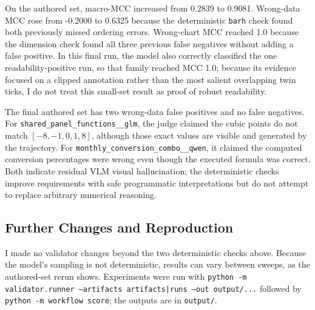 \documentclass[11pt]{article}
\begin{document}
On the authored set, macro-MCC increased from 0.2839 to 0.9081. Wrong-data MCC
rose from -0.2000 to 0.6325 because the deterministic \texttt{barh} check found
both previously missed ordering errors. Wrong-chart MCC reached 1.0 because the
dimension check found all three previous false negatives without adding a false
positive. In this final run, the model also correctly classified the one
readability-positive run, so that family reached MCC 1.0; because its evidence
focused on a clipped annotation rather than the most salient overlapping twin
ticks, I do not treat this small-set result as proof of robust readability.

The final authored set has two wrong-data false positives and no false
negatives. For \texttt{shared\_panel\_functions\_\_glm}, the judge claimed the
cubic points do not match $[-8,-1,0,1,8]$, although those exact values are
visible and generated by the trajectory. For
\texttt{monthly\_conversion\_combo\_\_qwen}, it claimed the computed
conversion percentages were wrong even though the executed formula was
correct. Both indicate residual VLM visual hallucination; the deterministic
checks improve requirements with safe programmatic interpretations but do not
attempt to replace arbitrary numerical reasoning.

\subsection{Further Changes and Reproduction}
I made no validator changes beyond the two deterministic checks above. Because the model's sampling is not
deterministic, results can vary between sweeps, as the authored-set rerun shows. Experiments were run with
\texttt{python -m validator.runner --artifacts artifacts|runs --out output/...} followed by
\texttt{python -m workflow score}; the outputs are in \texttt{output/}.
\end{document}
